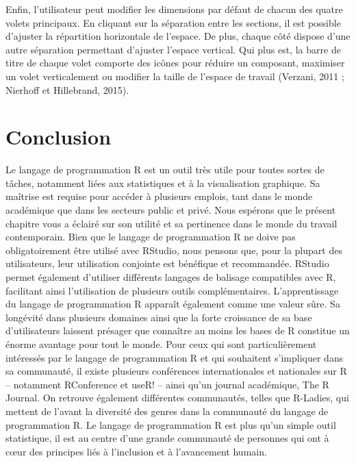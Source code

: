 \documentclass[
  letterpaper,
  DIV=11,
  numbers=noendperiod]{scrreprt}
\begin{document}
Enfin, l'utilisateur peut modifier les dimensions par défaut de chacun
des quatre volets principaux. En cliquant sur la séparation entre les
sections, il est possible d'ajuster la répartition horizontale de
l'espace. De plus, chaque côté dispose d'une autre séparation permettant
d'ajuster l'espace vertical. Qui plus est, la barre de titre de chaque
volet comporte des icônes pour réduire un composant, maximiser un volet
verticalement ou modifier la taille de l'espace de travail (Verzani,
2011 ; Nierhoff et Hillebrand, 2015).

\section{Conclusion}\label{conclusion-1}

Le langage de programmation R est un outil très utile pour toutes sortes
de tâches, notamment liées aux statistiques et à la visualisation
graphique. Sa maîtrise est requise pour accéder à plusieurs emplois,
tant dans le monde académique que dans les secteurs public et privé.
Nous espérons que le présent chapitre vous a éclairé sur son utilité et
sa pertinence dans le monde du travail contemporain. Bien que le langage
de programmation R ne doive pas obligatoirement être utilisé avec
RStudio, nous pensons que, pour la plupart des utilisateurs, leur
utilisation conjointe est bénéfique et recommandée. RStudio permet
également d'utiliser différents langages de balisage compatibles avec R,
facilitant ainsi l'utilisation de plusieurs outils complémentaires.
L'apprentissage du langage de programmation R apparaît également comme
une valeur sûre. Sa longévité dans plusieurs domaines ainsi que la forte
croissance de sa base d'utilisateurs laissent présager que connaître au
moins les bases de R constitue un énorme avantage pour tout le monde.
Pour ceux qui sont particulièrement intéressés par le langage de
programmation R et qui souhaitent s'impliquer dans sa communauté, il
existe plusieurs conférences internationales et nationales sur R --
notamment RConference et useR! -- ainsi qu'un journal académique, The R
Journal. On retrouve également différentes communautés, telles que
R-Ladies, qui mettent de l'avant la diversité des genres dans la
communauté du langage de programmation R. Le langage de programmation R
est plus qu'un simple outil statistique, il est au centre d'une grande
communauté de personnes qui ont à cœur des principes liés à l'inclusion
et à l'avancement humain.

\end{document}

